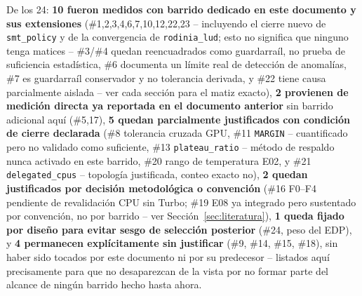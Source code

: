 De los 24: \textbf{10 fueron medidos con barrido dedicado en este documento
y sus extensiones} (\#1,2,3,4,6,7,10,12,22,23 -- incluyendo el cierre nuevo
de \texttt{smt\_policy} y de la convergencia de \texttt{rodinia\_lud}; esto
no significa que ninguno tenga matices -- \#3/\#4 quedan reencuadrados como
guardarraíl, no prueba de suficiencia estadística, \#6 documenta un límite
real de detección de anomalías, \#7 es guardarraíl conservador y no
tolerancia derivada, y \#22 tiene causa parcialmente aislada -- ver cada
sección para el matiz exacto), \textbf{2 provienen de medición directa ya
reportada en el documento anterior} sin barrido adicional aquí (\#5,17),
\textbf{5 quedan parcialmente justificados con condición de cierre
declarada} (\#8 tolerancia cruzada GPU, \#11 \texttt{MARGIN} -- cuantificado
pero no validado como suficiente, \#13 \texttt{plateau\_ratio} -- método de
respaldo nunca activado en este barrido, \#20 rango de temperatura E02, y
\#21 \texttt{delegated\_cpus} -- topología justificada, conteo exacto no),
\textbf{2 quedan justificados por decisión metodológica o convención}
(\#16 F0--F4 pendiente de revalidación CPU sin Turbo; \#19 E08 ya integrado
pero sustentado por convención, no por barrido -- ver
Sección~\ref{sec:literatura}), \textbf{1 queda fijado por diseño para
evitar sesgo de selección posterior} (\#24, peso del EDP), y \textbf{4
permanecen explícitamente sin
justificar} (\#9, \#14, \#15, \#18), sin haber sido tocados por este
documento ni por su predecesor -- listados aquí precisamente para que no
desaparezcan de la vista por no formar parte del alcance de ningún barrido
hecho hasta ahora.
